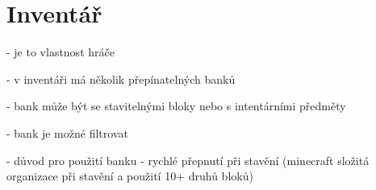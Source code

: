 
\section{Inventář}

- je to vlastnost hráče

- v inventáři má několik přepínatelných banků

- bank může být se stavitelnými bloky nebo s intentárními předměty

- bank je možné filtrovat

- důvod pro použití banku - rychlé přepnutí při stavění (minecraft složitá organizace při stavění a použití 10+ druhů bloků)